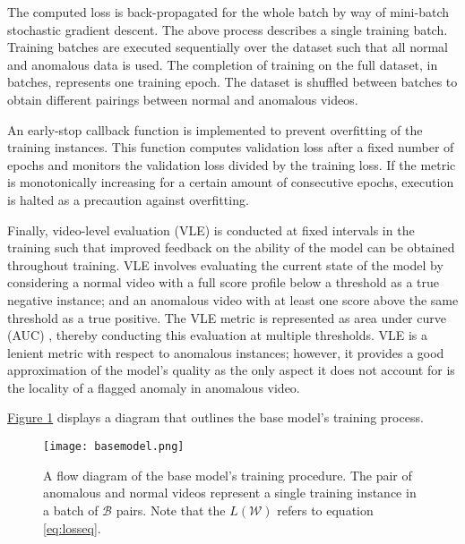 \documentclass[sigplan,authorversion,nonacm, 9pt]{acmart}
\begin{document}
The computed loss is back-propagated for the whole batch by way of mini-batch stochastic gradient descent. 
The above process describes a single training batch. Training batches are executed sequentially over the dataset such that all normal and anomalous data is used. The completion of training on the full dataset, in batches, represents one training epoch. The dataset is shuffled between batches to obtain different pairings between normal and anomalous videos.
\par
An early-stop callback function is implemented to prevent overfitting of the training instances. This function computes validation loss after a fixed number of epochs and monitors the validation loss divided by the training loss. If the metric is monotonically increasing for a certain amount of consecutive epochs, execution is halted as a precaution against overfitting. 
\par
Finally, video-level evaluation (VLE) is conducted at fixed intervals in the training such that improved feedback on the ability of the model can be obtained throughout training. VLE involves evaluating the current state of the model by considering a normal video with a full score profile below a threshold as a true negative instance; and an anomalous video with at least one score above the same threshold as a true positive. The VLE metric is represented as area under curve (AUC) \cite{auc}, thereby conducting this evaluation at multiple thresholds. VLE is a lenient metric with respect to anomalous instances; however, it provides a good approximation of the model's quality as the only aspect it does not account for is the locality of a flagged anomaly in anomalous video.
\par
\hyperref[fig:basemodel]{Figure 1} displays a diagram that outlines the base model's training process.
\begin{figure*}[h!]
\centering
\texttt{[image: basemodel.png]}
\caption{A flow diagram of the base model's training procedure. The pair of anomalous and normal videos represent a single training instance in a batch of $\mathcal{B}$ pairs. Note that the $L(\mathcal{W})$ refers to equation \ref{eq:losseq}.}
\label{fig:basemodel}
\end{figure*}
\end{document}
